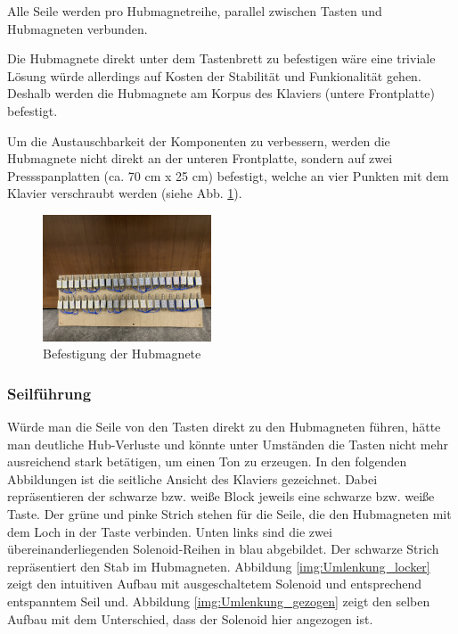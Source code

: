 Alle Seile werden pro Hubmagnetreihe, parallel zwischen Tasten und Hubmagneten verbunden.

Die Hubmagnete direkt unter dem Tastenbrett zu befestigen wäre eine triviale Lösung würde allerdings auf Kosten der Stabilität und Funkionalität gehen. %
Deshalb werden die Hubmagnete am Korpus des Klaviers (untere Frontplatte) befestigt.

Um die Austauschbarkeit der Komponenten zu verbessern, werden die Hubmagnete nicht direkt an der unteren Frontplatte,
sondern auf zwei Pressspanplatten (ca. 70 cm x 25 cm) befestigt, welche an vier Punkten mit dem Klavier verschraubt werden (siehe Abb. \ref{fig:BefestigungHubmagnete}). %

\begin{figure}[htbp]
	\centering
	\includegraphics[width=5cm]{img/Magnetbrett.jpg}
	\caption{Befestigung der Hubmagnete}
	\label{fig:BefestigungHubmagnete}
\end{figure}

\subsubsection{Seilführung}

Würde man die Seile von den Tasten direkt zu den Hubmagneten führen,
hätte man deutliche Hub-Verluste und könnte unter Umständen die Tasten nicht mehr ausreichend stark betätigen, um einen Ton zu erzeugen.
\newline
In den folgenden Abbildungen ist die seitliche Ansicht des Klaviers gezeichnet.
Dabei repräsentieren der schwarze bzw. weiße Block jeweils eine schwarze bzw. weiße Taste.
Der grüne und pinke Strich stehen für die Seile, die den Hubmagneten mit dem Loch in der Taste verbinden.
Unten links sind die zwei übereinanderliegenden Solenoid-Reihen in blau abgebildet.
Der schwarze Strich repräsentiert den Stab im Hubmagneten. %
\newline
Abbildung \ref{img:Umlenkung_locker} zeigt den intuitiven Aufbau mit ausgeschaltetem Solenoid und entsprechend entspanntem Seil und.
Abbildung \ref{img:Umlenkung_gezogen} zeigt den selben Aufbau mit dem Unterschied, dass der Solenoid hier angezogen ist.

